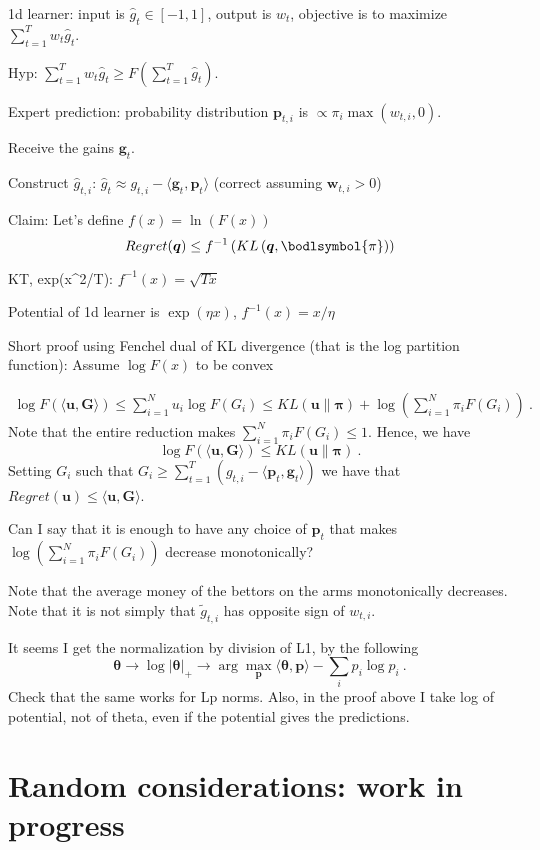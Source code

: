 \documentclass{article}
\newcommand{\bu}{\boldsymbol{u}}
\newcommand{\bw}{\boldsymbol{w}}
\newcommand{\bp}{\boldsymbol{p}}
\newcommand{\bg}{\boldsymbol{g}}
\newcommand{\btheta}{\boldsymbol{\theta}}
\begin{document}
1d learner: input is $\hat{g}_t \in[-1,1]$, output is $w_t$, objective is to maximize $\sum_{t=1}^T w_t \hat{g}_t$.

Hyp: $\sum_{t=1}^T w_t \hat{g}_t \geq F(\sum_{t=1}^T \hat{g}_t)$.

Expert prediction: probability distribution $\boldsymbol{p}_{t,i}$ is $\propto \pi_i \max(w_{t,i},0)$.

Receive the gains $\boldsymbol{g}_t$.

Construct $\hat{g}_{t,i}$: $\hat{g}_t \approx g_{t,i} - \langle \boldsymbol{g}_t, \boldsymbol{p}_t\rangle$ (correct assuming $\bw_{t,i}>0$)

Claim:
Let's define $f(x)=\ln(F(x))$
\[
Regret(\boldsymbol{q}) \leq f^{-1}\left(KL\left(\boldsymbol{q},\bodlsymbol{\pi}\right)\right)
\]

KT, exp(x^2/T): $f^{-1}(x)=\sqrt{T x}$

Potential of 1d learner is $\exp(\eta x)$,  $f^{-1}(x)=x/\eta$


Short proof using Fenchel dual of KL divergence (that is the log partition function):
Assume $\log F(x)$ to be convex

\begin{align*}
\log F(\langle \bu, \boldsymbol{G}\rangle)
\leq \sum_{i=1}^N u_i \log F(G_i)
\leq KL(\bu \| \boldsymbol{\pi}) + \log\left(\sum_{i=1}^N \pi_i F(G_i)\right)~.
\end{align*}
Note that the entire reduction makes $\sum_{i=1}^N \pi_i F(G_i)\leq 1$. Hence, we have
\[
\log F(\langle \bu, \boldsymbol{G}\rangle) 
\leq KL(\bu \| \boldsymbol{\pi})~.
\]
Setting $G_i$ such that $G_i \geq \sum_{t=1}^T (g_{t,i}-\langle \bp_t, \bg_t\rangle)$ we have that $Regret(\bu) \leq \langle \bu, \boldsymbol{G}\rangle$.


Can I say that it is enough to have any choice of $\bp_t$ that makes $\log\left(\sum_{i=1}^N \pi_i F(G_i)\right)$ decrease monotonically?

Note that the average money of the bettors on the arms monotonically decreases. Note that it is not simply that $\tilde{g}_{t,i}$ has opposite sign of $w_{t,i}$.

It seems I get the normalization by division of L1, by the following
\[
\btheta \rightarrow \log |\btheta|_+ \rightarrow \arg\max_{\bp} \langle \btheta, \bp\rangle - \sum_{i} p_i \log p_i~.
\]
Check that the same works for Lp norms.
Also, in the proof above I take log of potential, not of theta, even if the potential gives the predictions.

\section{Random considerations: work in progress}
\end{document}
